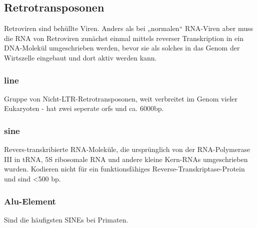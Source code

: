 \subsection{Retrotransposonen} 
Retroviren sind behüllte Viren. Anders als bei „normalen“ RNA-Viren aber muss die RNA von Retroviren zunächst einmal mittels reverser Transkription in ein DNA-Molekül umgeschrieben werden, bevor sie als solches in das Genom der Wirtszelle eingebaut und dort aktiv werden kann. 
\subsubsection{\gls{line}}  
Gruppe von Nicht-LTR-Retrotransposonen, weit verbreitet im Genom vieler Eukaryoten - hat zwei seperate \glspl{orf} und ca. 6000bp. 
\subsubsection{\gls{sine}} 
Revers-transkribierte RNA-Moleküle, die ursprünglich von der RNA-Polymerase III in tRNA, 5S ribosomale RNA und andere kleine Kern-RNAs umgeschrieben wurden. Kodieren nicht für ein funktionsfähiges Reverse-Transkriptase-Protein und sind <500 bp.
\subsubsection{Alu-Element} 
Sind die häufigsten SINEs bei Primaten. 



